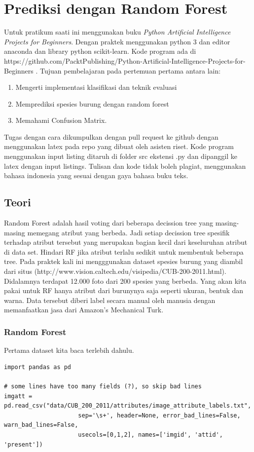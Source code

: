 \chapter{Prediksi dengan Random Forest}

Untuk pratikum saati ini menggunakan buku \textit{Python Artificial Intelligence Projects for Beginners}\cite{eckroth2018python}. Dengan praktek menggunakan python 3 dan editor anaconda dan library python scikit-learn.
Kode program ada di https://github.com/PacktPublishing/Python-Artificial-Intelligence-Projects-for-Beginners .
Tujuan pembelajaran pada pertemuan pertama antara lain:
\begin{enumerate}
    \item
          Mengerti implementasi klasifikasi dan teknik evaluasi
    \item
          Memprediksi spesies burung dengan random forest
    \item
          Memahami Confusion Matrix.
\end{enumerate}
Tugas dengan cara dikumpulkan dengan pull request ke github dengan menggunakan latex pada repo yang dibuat oleh asisten riset. Kode program menggunakan input listing ditaruh di folder src ekstensi .py dan dipanggil ke latex dengan input listings. Tulisan dan kode tidak boleh plagiat, menggunakan bahasa indonesia yang sesuai dengan gaya bahasa buku teks.

\section{Teori}
Random Forest adalah hasil voting dari beberapa decission tree yang masing-masing memegang atribut yang berbeda. Jadi setiap decission tree spesifik terhadap atribut tersebut yang merupakan bagian kecil dari keseluruhan atribut di data set. Hindari RF jika atribut terlalu sedikit untuk membentuk beberapa tree. Pada praktek kali ini mengggunakan dataset spesies burung yang diambil dari situs
(http://www.vision.caltech.edu/visipedia/CUB-200-2011.html). Didalamnya terdapat 12.000 foto dari 200 spesies yang berbeda. Yang akan kita pakai untuk RF hanya atribut dari burunynya saja seperti ukuran, bentuk dan warna. Data tersebut diberi label secara manual oleh manusia dengan memanfaatkan jasa dari Amazon's Mechanical Turk.

\subsection{Random Forest}
Pertama dataset kita baca terlebih dahulu.
\begin{lstlisting}[caption=Membaca data file txt,label={lst:fungsisederhana}]
import pandas as pd

# some lines have too many fields (?), so skip bad lines
imgatt = pd.read_csv("data/CUB_200_2011/attributes/image_attribute_labels.txt",
                     sep='\s+', header=None, error_bad_lines=False, warn_bad_lines=False,
                     usecols=[0,1,2], names=['imgid', 'attid', 'present'])

\end{lstlisting}

